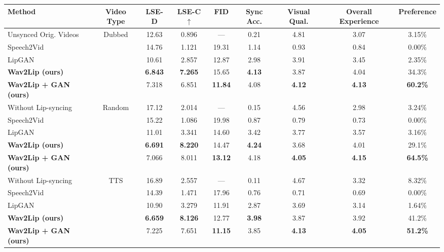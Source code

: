 \documentclass[sigconf]{acmart}
\begin{document}
\begin{table}[ht]
  \setlength{\tabcolsep}{4pt}
    \centering
    
    \begin{tabular}{|l|c|c|c|c||c|c|c|c|}
    \hline
    
    \textbf{Method} & \textbf{Video Type} & \textbf{LSE-D } & \textbf{LSE-C $\uparrow$} & \textbf{FID } & \textbf{Sync Acc.} & \textbf{Visual Qual.} & \textbf{Overall Experience} & \textbf{Preference}\\
    \hline
    Unsynced Orig. Videos & \multirow{5}{*}{Dubbed} & 12.63 & 0.896 & --- & 0.21 & 4.81 & 3.07 & 3.15\% \\
    Speech2Vid~\cite{jamaludin2019you} & & 14.76 & 1.121 & 19.31 & 1.14 & 0.93 & 0.84 & 0.00\% \\
    LipGAN~\cite{kr2019towards} & & 10.61 & 2.857 & 12.87 & 2.98 & 3.91 & 3.45 & 2.35\%\\
    \textbf{Wav2Lip (ours)} & & \textbf{6.843} & \textbf{7.265} & 15.65 & \textbf{4.13} & 3.87 & 4.04 & 34.3\%\\
    \textbf{Wav2Lip + GAN (ours)} & & 7.318 & 6.851 & \textbf{11.84} & 4.08 & \textbf{4.12} & \textbf{4.13} & \textbf{60.2\%}\\
    \hline
    Without Lip-syncing & \multirow{5}{*}{Random} & 17.12 & 2.014 & --- & 0.15 & 4.56 & 2.98 & 3.24\%\\
    Speech2Vid~\cite{jamaludin2019you} & & 15.22 & 1.086 & 19.98 & 0.87 & 0.79 & 0.73 & 0.00\% \\
    LipGAN~\cite{kr2019towards} & & 11.01 & 3.341 & 14.60 & 3.42 & 3.77 & 3.57 & 3.16\%\\
    \textbf{Wav2Lip (ours)} & & \textbf{6.691} & \textbf{8.220} & 14.47 & \textbf{4.24} & 3.68 & 4.01 & 29.1\%\\
    \textbf{Wav2Lip + GAN (ours)} & & 7.066 & 8.011 & \textbf{13.12} & 4.18 & \textbf{4.05} & \textbf{4.15} & \textbf{64.5\%}\\
    \hline
    Without Lip-syncing & \multirow{6}{*}{TTS} & 16.89 & 2.557 & --- & 0.11 & 4.67 & 3.32 & 8.32\% \\
    Speech2Vid~\cite{jamaludin2019you} & & 14.39 & 1.471 & 17.96 & 0.76 & 0.71 & 0.69 & 0.00\%\\
    LipGAN~\cite{kr2019towards} & & 10.90 & 3.279 & 11.91 & 2.87 & 3.69 & 3.14 & 1.64\%\\
    \textbf{Wav2Lip (ours)} & & \textbf{6.659} & \textbf{8.126} & 12.77 & \textbf{3.98} & 3.87 & 3.92 & 41.2\%\\
    \textbf{Wav2Lip + GAN (ours)} & & 7.225 & 7.651 & \textbf{11.15} & 3.85 & \textbf{4.13} & \textbf{4.05} & \textbf{51.2\%}\\

\end{tabular}
\end{table}
\end{document}
